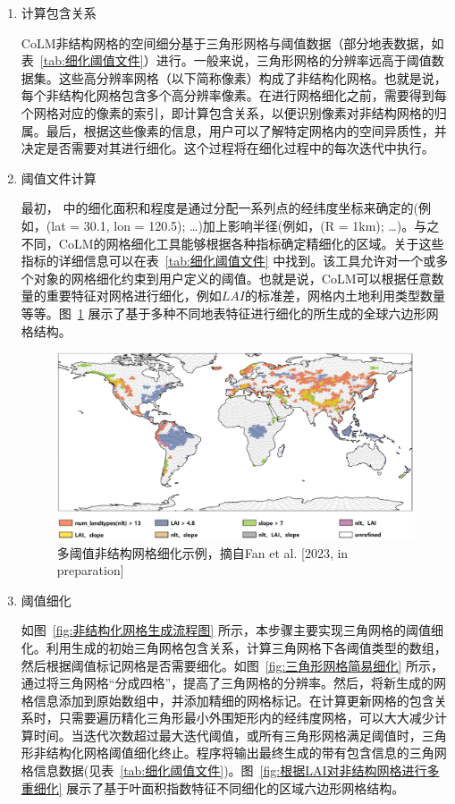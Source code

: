 \begin{enumerate}
\item 计算包含关系

CoLM非结构网格的空间细分基于三角形网格与阈值数据（部分地表数据，如表~\ref{tab:细化阈值文件}）进行。一般来说，三角形网格的分辨率远高于阈值数据集。这些高分辨率网格（以下简称像素）构成了非结构化网格。也就是说，每个非结构化网格包含多个高分辨率像素。在进行网格细化之前，需要得到每个网格对应的像素的索引，即计算包含关系，以便识别像素对非结构网格的归属。最后，根据这些像素的信息，用户可以了解特定网格内的空间异质性，并决定是否需要对其进行细化。这个过程将在细化过程中的每次迭代中执行。

\item 阈值文件计算


最初，\citet{walko_direct_2011} 中的细化面积和程度是通过分配一系列点的经纬度坐标来确定的(例如，(lat = 30.1, lon = 120.5); \dots)加上影响半径(例如，(R = 1km); \dots)。与之不同，CoLM的网格细化工具能够根据各种指标确定精细化的区域。关于这些指标的详细信息可以在表~\ref{tab:细化阈值文件} 中找到。该工具允许对一个或多个对象的网格细化约束到用户定义的阈值。也就是说，CoLM可以根据任意数量的重要特征对网格进行细化，例如$LAI$的标准差，网格内土地利用类型数量等等。图~\ref{fig:多阈值非结构网格细化} 展示了基于多种不同地表特征进行细化的所生成的全球六边形网格结构。

{
\begin{figure}[htbp]
\centering
\includegraphics{Figures/模式构架/多阈值非结构网格细化.png}
\caption{多阈值非结构网格细化示例，摘自Fan et al. [2023, in preparation]}
\label{fig:多阈值非结构网格细化}
\end{figure}
}

\item 阈值细化

如图~\ref{fig:非结构化网格生成流程图} 所示，本步骤主要实现三角网格的阈值细化。利用生成的初始三角网格包含关系，计算三角网格下各阈值类型的数组，然后根据阈值标记网格是否需要细化。如图~\ref{fig:三角形网格简易细化} 所示，通过将三角网格“分成四格”，提高了三角网格的分辨率。然后，将新生成的网格信息添加到原始数组中，并添加精细的网格标记。在计算更新网格的包含关系时，只需要遍历精化三角形最小外围矩形内的经纬度网格，可以大大减少计算时间。当迭代次数超过最大迭代阈值，或所有三角形网格满足阈值时，三角形非结构化网格阈值细化终止。程序将输出最终生成的带有包含信息的三角网格信息数据(见表~\ref{tab:细化阈值文件})。图~\ref{fig:根据LAI对非结构网格进行多重细化} 展示了基于叶面积指数特征不同细化的区域六边形网格结构。


\end{enumerate}
